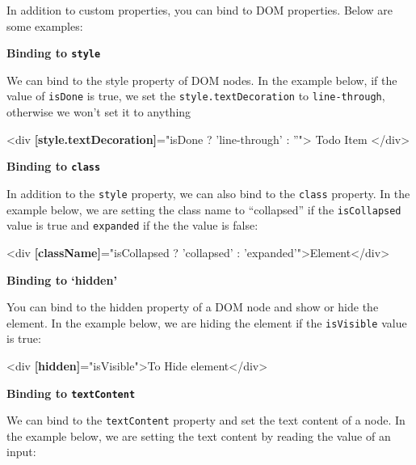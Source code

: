 \documentclass[12pt,]{article}
\newenvironment{Shaded}{}{}
\newcommand{\KeywordTok}[1]{\textcolor[rgb]{0.00,0.00,1.00}{{#1}}}
\newcommand{\StringTok}[1]{\textcolor[rgb]{0.00,0.50,0.50}{{#1}}}
\newcommand{\OtherTok}[1]{\textcolor[rgb]{1.00,0.25,0.00}{{#1}}}
\newcommand{\ErrorTok}[1]{\textcolor[rgb]{1.00,0.00,0.00}{\textbf{{#1}}}}
\newcommand{\NormalTok}[1]{{#1}}
\begin{document}
In addition to custom properties, you can bind to DOM properties. Below
are some examples:

\textbf{Binding to \texttt{style}}

We can bind to the style property of DOM nodes. In the example below, if
the value of \texttt{isDone} is true, we set the
\texttt{style.textDecoration} to \texttt{line-through}, otherwise we
won't set it to anything

\begin{Shaded}
\begin{Highlighting}[numbers=left,,]
\KeywordTok{<div} \ErrorTok{[style.textDecoration]}\OtherTok{=}\StringTok{"isDone ? 'line-through' : ''"}\KeywordTok{>} \NormalTok{Todo Item }\KeywordTok{</div>}
\end{Highlighting}
\end{Shaded}

\textbf{Binding to \texttt{class}}

In addition to the \texttt{style} property, we can also bind to the
\texttt{class} property. In the example below, we are setting the class
name to ``collapsed'' if the \texttt{isCollapsed} value is true and
\texttt{expanded} if the the value is false:

\begin{Shaded}
\begin{Highlighting}[numbers=left,,]
\KeywordTok{<div} \ErrorTok{[className]}\OtherTok{=}\StringTok{"isCollapsed ? 'collapsed' : 'expanded'"}\KeywordTok{>}\NormalTok{Element}\KeywordTok{</div>}
\end{Highlighting}
\end{Shaded}

\textbf{Binding to `hidden'}

You can bind to the hidden property of a DOM node and show or hide the
element. In the example below, we are hiding the element if the
\texttt{isVisible} value is true:

\begin{Shaded}
\begin{Highlighting}[numbers=left,,]
\KeywordTok{<div} \ErrorTok{[hidden]}\OtherTok{=}\StringTok{"isVisible"}\KeywordTok{>}\NormalTok{To Hide element}\KeywordTok{</div>}
\end{Highlighting}
\end{Shaded}

\textbf{Binding to \texttt{textContent}}

We can bind to the \texttt{textContent} property and set the text
content of a node. In the example below, we are setting the text content
by reading the value of an input:
\end{document}
